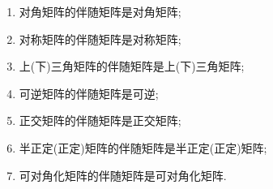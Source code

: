 \documentclass[../../main.tex]{subfiles}%
\begin{document}
\begin{proposition}[伴随矩阵的继承性]\label{proposition:伴随矩阵的继承性}
\begin{enumerate}
\item\label{伴随矩阵的继承性1} 对角矩阵的伴随矩阵是对角矩阵;

\item 对称矩阵的伴随矩阵是对称矩阵;

\item 上(下)三角矩阵的伴随矩阵是上(下)三角矩阵;

\item 可逆矩阵的伴随矩阵是可逆;

\item 正交矩阵的伴随矩阵是正交矩阵;

\item 半正定(正定)矩阵的伴随矩阵是半正定(正定)矩阵;

\item 可对角化矩阵的伴随矩阵是可对角化矩阵.
\end{enumerate}
\end{proposition}
\end{document}
